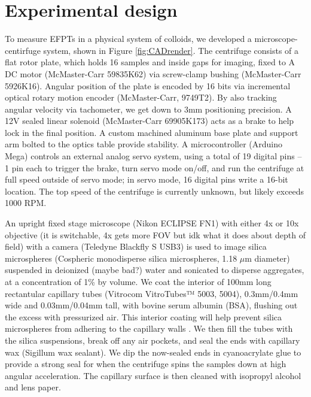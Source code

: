 
\section{Experimental design}

To measure EFPTs in a physical system of colloids, we developed a microscope-centirfuge system, shown in Figure \ref{fig:CADrender}. The centrifuge consists of a flat rotor plate, which holds 16 samples and inside gaps for imaging, fixed to A DC motor (McMaster-Carr 59835K62) via screw-clamp bushing (McMaster-Carr 5926K16). Angular position of the plate is encoded by 16 bits via incremental optical rotary motion encoder (McMaster-Carr, 9749T2). By also tracking angular velocity via tachometer, we get down to 3mm positioning precision. A 12V sealed linear solenoid (McMaster-Carr 69905K173) acts as a brake to help lock in the final position. A custom machined aluminum base plate and support arm bolted to the optics table provide stability. A microcontroller (Arduino Mega) controls an external analog servo system, using a total of 19 digital pins -- 1 pin each to trigger the brake, turn servo mode on/off, and run the centrifuge at full speed outside of servo mode; in servo mode, 16 digital pins write a 16-bit location. The top speed of the centrifuge is currently unknown, but likely exceeds 1000 RPM. 

An upright fixed stage microscope (Nikon ECLIPSE FN1) with either 4x or 10x objective (it is switchable, 4x gets more FOV but idk what it does about depth of field) with a camera (Teledyne Blackfly S USB3) is used to image silica microspheres (Cospheric monodisperse silica microspheres, 1.18 $\mu$m diameter) suspended in deionized (maybe bad?) water and sonicated to disperse aggregates, at a concentration of 1\% by volume. We coat the interior of 100mm long rectantular capillary tubes (Vitrocom VitroTubes™ 5003, 5004), 0.3mm/0.4mm wide and 0.03mm/0.04mm tall, with bovine serum albumin (BSA), flushing out the excess with pressurized air. This interior coating will help prevent silica microspheres from adhering to the capillary walls . We then fill the tubes with the silica suspensions, break off any air pockets, and seal the ends with capillary wax (Sigillum wax sealant). We dip the now-sealed ends in cyanoacrylate glue to provide a strong seal for when the centrifuge spins the samples down at high angular acceleration. The capillary surface is then cleaned with isopropyl alcohol and lens paper.

